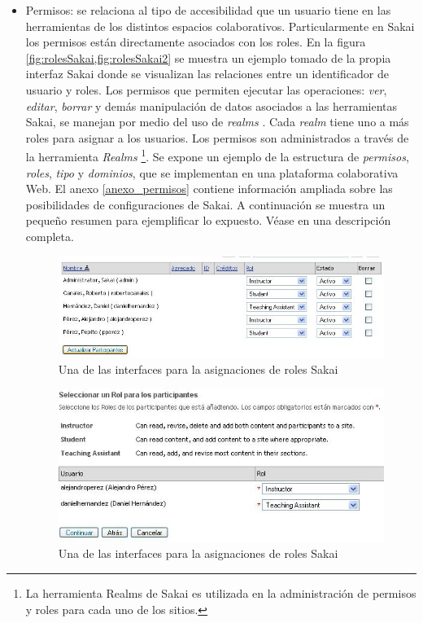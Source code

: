 \begin{itemize}
\item Permisos: se relaciona al tipo de accesibilidad que un usuario tiene
en las herramientas de los distintos espacios colaborativos. Particularmente en
Sakai los permisos están directamente asociados con los roles. En la figura
\ref{fig:rolesSakai,fig:rolesSakai2} se muestra un ejemplo tomado de la propia
interfaz Sakai
donde se visualizan las relaciones entre un identificador de usuario y roles. 
Los permisos que permiten ejecutar las operaciones: \textit{ver},
\textit{editar}, \textit{borrar} y demás manipulación de datos asociados a las
herramientas Sakai, se manejan por medio del uso de \textit{realms}
\cite{sakaimanual}. Cada \textit{realm} tiene uno a más roles para asignar a los
usuarios. Los permisos son administrados a
través de la herramienta \textit{Realms}
\footnote{La herramienta Realms de Sakai es utilizada en la administración de
permisos y roles para cada uno de los sitios.}. Se expone un ejemplo de la
estructura de \textit{permisos}, \textit{roles}, \textit{tipo} y
\textit{dominios}, que se implementan en una
plataforma colaborativa Web. El anexo \ref{anexo_permisos} contiene
información ampliada sobre las posibilidades de configuraciones de Sakai. A
continuación se muestra un pequeño resumen para ejemplificar lo expuesto.
Véase en \cite{permisos_roles} una descripción completa. 


\begin{figure} 
\begin{center}
 \includegraphics [width=4 in,totalheight=2 in] {Ch1/Figuras/RolesSakai.jpg}
\caption {Una de las interfaces para la asignaciones de roles Sakai}
\label{fig:rolesSakai}
\end{center}
\end{figure}


\begin{figure} 
\begin{center}
 \includegraphics [width=4 in,totalheight=2 in] {Ch1/Figuras/RolesSakai2.jpg}
\caption {Una de las interfaces para la asignaciones de roles Sakai}
\label{fig:rolesSakai2}
\end{center}
\end{figure}




\end{itemize}
